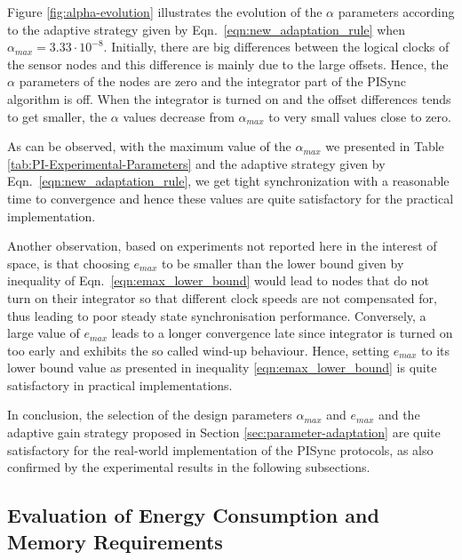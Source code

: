 \documentclass[english,a4paper,10pt,final]{article}
\numberwithin{equation}{section}
\numberwithin{figure}{section}
\begin{document}
Figure \ref{fig:alpha-evolution} illustrates the evolution of the $\alpha$ parameters  according to the adaptive strategy given by Eqn.~\eqref{eqn:new_adaptation_rule} when  $\alpha_{max} = 3.33\cdot10^{-8}$. Initially, there are big differences between the logical clocks of the sensor nodes and this difference is  mainly due to the large offsets.  Hence, the $\alpha$ parameters of the nodes are zero and the integrator part of the PISync algorithm is off. When the integrator is turned on
and the offset differences tends to get smaller, the $\alpha$ values decrease from $\alpha_{max}$ to very small values close to zero.

As can be observed, with the maximum value of the $\alpha_{max}$ we presented in Table \ref{tab:PI-Experimental-Parameters} and the adaptive strategy given by Eqn.~\eqref{eqn:new_adaptation_rule}, we get tight synchronization with a reasonable time to convergence and hence these values are quite satisfactory for the practical implementation. 


Another observation, based on experiments not reported here in the interest of space, is that choosing $e_{max}$ to be smaller than the lower bound given by inequality of Eqn.~\eqref{eqn:emax_lower_bound} would lead to nodes that do not turn on their integrator so that different clock speeds are not compensated for, thus leading to poor steady state synchronisation performance. Conversely, a large value of $e_{max}$ leads to a longer convergence late since integrator is turned on too early and exhibits the so called wind-up behaviour. Hence, setting $e_{max}$ to its lower bound value as presented in inequality \ref{eqn:emax_lower_bound} is quite satisfactory in practical implementations.

In conclusion, the selection of the design parameters $\alpha_{max}$ and $e_{max}$ and the adaptive gain strategy proposed in Section \ref{sec:parameter-adaptation} are quite satisfactory for the real-world implementation of the PISync protocols, as also confirmed by the experimental results in the following subsections.

\subsection{Evaluation of Energy Consumption and Memory Requirements}
\end{document}
